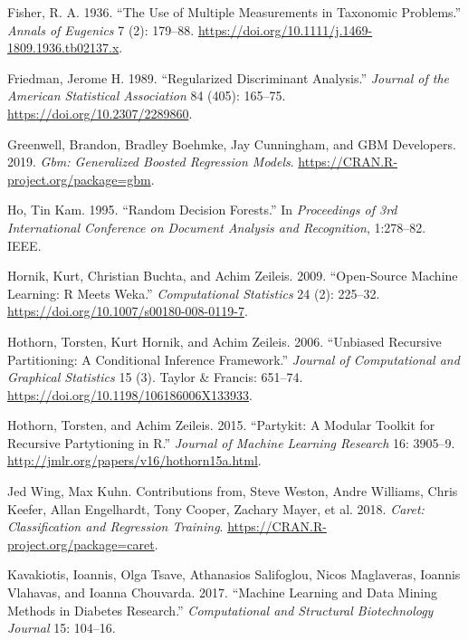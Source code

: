 \documentclass[]{book}
\theoremstyle{plain}
\theoremstyle{definition}
\theoremstyle{definition}
\theoremstyle{definition}
\theoremstyle{definition}
\theoremstyle{remark}
\begin{document}
\leavevmode\hypertarget{ref-fisher1936}{}%
Fisher, R. A. 1936. ``The Use of Multiple Measurements in Taxonomic Problems.'' \emph{Annals of Eugenics} 7 (2): 179--88. \url{https://doi.org/10.1111/j.1469-1809.1936.tb02137.x}.

\leavevmode\hypertarget{ref-friedman1989}{}%
Friedman, Jerome H. 1989. ``Regularized Discriminant Analysis.'' \emph{Journal of the American Statistical Association} 84 (405): 165--75. \url{https://doi.org/10.2307/2289860}.

\leavevmode\hypertarget{ref-R-gbm}{}%
Greenwell, Brandon, Bradley Boehmke, Jay Cunningham, and GBM Developers. 2019. \emph{Gbm: Generalized Boosted Regression Models}. \url{https://CRAN.R-project.org/package=gbm}.

\leavevmode\hypertarget{ref-ho1995}{}%
Ho, Tin Kam. 1995. ``Random Decision Forests.'' In \emph{Proceedings of 3rd International Conference on Document Analysis and Recognition}, 1:278--82. IEEE.

\leavevmode\hypertarget{ref-R-Rweka}{}%
Hornik, Kurt, Christian Buchta, and Achim Zeileis. 2009. ``Open-Source Machine Learning: R Meets Weka.'' \emph{Computational Statistics} 24 (2): 225--32. \url{https://doi.org/10.1007/s00180-008-0119-7}.

\leavevmode\hypertarget{ref-R-party}{}%
Hothorn, Torsten, Kurt Hornik, and Achim Zeileis. 2006. ``Unbiased Recursive Partitioning: A Conditional Inference Framework.'' \emph{Journal of Computational and Graphical Statistics} 15 (3). Taylor \& Francis: 651--74. \url{https://doi.org/10.1198/106186006X133933}.

\leavevmode\hypertarget{ref-R-partykit}{}%
Hothorn, Torsten, and Achim Zeileis. 2015. ``Partykit: A Modular Toolkit for Recursive Partytioning in R.'' \emph{Journal of Machine Learning Research} 16: 3905--9. \url{http://jmlr.org/papers/v16/hothorn15a.html}.

\leavevmode\hypertarget{ref-kuhn}{}%
Jed Wing, Max Kuhn. Contributions from, Steve Weston, Andre Williams, Chris Keefer, Allan Engelhardt, Tony Cooper, Zachary Mayer, et al. 2018. \emph{Caret: Classification and Regression Training}. \url{https://CRAN.R-project.org/package=caret}.

\leavevmode\hypertarget{ref-kavakiotis2017}{}%
Kavakiotis, Ioannis, Olga Tsave, Athanasios Salifoglou, Nicos Maglaveras, Ioannis Vlahavas, and Ioanna Chouvarda. 2017. ``Machine Learning and Data Mining Methods in Diabetes Research.'' \emph{Computational and Structural Biotechnology Journal} 15: 104--16.
\end{document}
